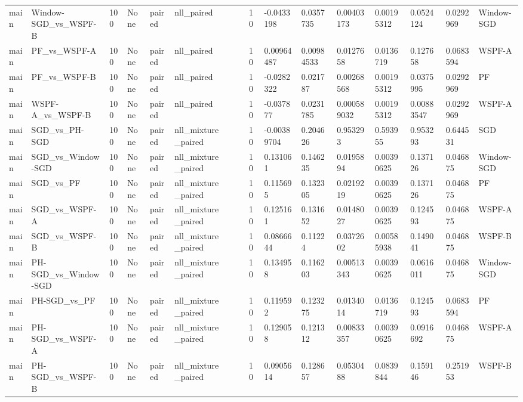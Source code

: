 \begin{tabular}{llllllllllllllll}
main & Window-SGD\_vs\_WSPF-B & 100 & None & paired & nll\_paired &  &  & 10 & -0.0433198 & 0.0357735 & 0.00403173 & 0.00195312 & 0.0524124 & 0.0292969 & Window-SGD \\
main & PF\_vs\_WSPF-A & 100 & None & paired & nll\_paired &  &  & 10 & 0.00964487 & 0.00984533 & 0.0127658 & 0.0136719 & 0.127658 & 0.0683594 & WSPF-A \\
main & PF\_vs\_WSPF-B & 100 & None & paired & nll\_paired &  &  & 10 & -0.0282322 & 0.021787 & 0.00268568 & 0.00195312 & 0.0375995 & 0.0292969 & PF \\
main & WSPF-A\_vs\_WSPF-B & 100 & None & paired & nll\_paired &  &  & 10 & -0.037877 & 0.0231785 & 0.000589032 & 0.00195312 & 0.00883547 & 0.0292969 & WSPF-A \\
main & SGD\_vs\_PH-SGD & 100 & None & paired & nll\_mixture\_paired &  &  & 10 & -0.00389704 & 0.204626 & 0.953293 & 0.593955 & 0.953293 & 0.644531 & SGD \\
main & SGD\_vs\_Window-SGD & 100 & None & paired & nll\_mixture\_paired &  &  & 10 & 0.131061 & 0.146235 & 0.0195894 & 0.00390625 & 0.137126 & 0.046875 & Window-SGD \\
main & SGD\_vs\_PF & 100 & None & paired & nll\_mixture\_paired &  &  & 10 & 0.115695 & 0.132305 & 0.0219219 & 0.00390625 & 0.137126 & 0.046875 & PF \\
main & SGD\_vs\_WSPF-A & 100 & None & paired & nll\_mixture\_paired &  &  & 10 & 0.125161 & 0.131652 & 0.0148027 & 0.00390625 & 0.124593 & 0.046875 & WSPF-A \\
main & SGD\_vs\_WSPF-B & 100 & None & paired & nll\_mixture\_paired &  &  & 10 & 0.0866644 & 0.11224 & 0.0372602 & 0.00585938 & 0.149041 & 0.046875 & WSPF-B \\
main & PH-SGD\_vs\_Window-SGD & 100 & None & paired & nll\_mixture\_paired &  &  & 10 & 0.134958 & 0.116203 & 0.00513343 & 0.00390625 & 0.0616011 & 0.046875 & Window-SGD \\
main & PH-SGD\_vs\_PF & 100 & None & paired & nll\_mixture\_paired &  &  & 10 & 0.119592 & 0.123275 & 0.0134014 & 0.0136719 & 0.124593 & 0.0683594 & PF \\
main & PH-SGD\_vs\_WSPF-A & 100 & None & paired & nll\_mixture\_paired &  &  & 10 & 0.129058 & 0.121312 & 0.00833357 & 0.00390625 & 0.0916692 & 0.046875 & WSPF-A \\
main & PH-SGD\_vs\_WSPF-B & 100 & None & paired & nll\_mixture\_paired &  &  & 10 & 0.0905614 & 0.128657 & 0.0530488 & 0.0839844 & 0.159146 & 0.251953 & WSPF-B \\

\end{tabular}
